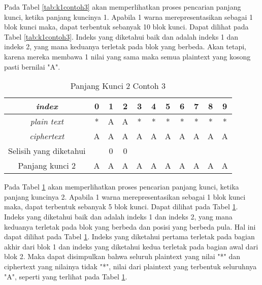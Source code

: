 	Pada Tabel \ref{tab:k1contoh3} akan memperlihatkan proses pencarian panjang kunci, ketika panjang kuncinya 1. Apabila 1 warna merepresentasikan sebagai 1 blok kunci maka, dapat terbentuk sebanyak 10 blok kunci. Dapat dilihat pada Tabel \ref{tab:k1contoh3}. Indeks yang diketahui baik \plaintext dan \ciphertext adalah indeks 1 dan indeks 2, yang mana keduanya terletak pada blok yang berbeda. Akan tetapi, karena mereka membawa 1 nilai yang sama maka semua plaintext yang kosong pasti bernilai "A".
	\\
	\begin{table}[H]
	 	\centering
	 	\caption{Panjang Kunci 2 Contoh 3}
	 	\setlength{\arrayrulewidth}{.08em}
	 	\begin{tabular}{|c|c|c|c|c|c|c|c|c|c|c|}\hline
	 	\textit{index}&0&1&2&3&4&5&6&7&8&9\\ \hline
	 	\textit{plain text}&\cellcolor{blue!15}*&\cellcolor{blue!15}A&\cellcolor{green!15}A&\cellcolor{green!15}*&\cellcolor{pink!30}*&\cellcolor{pink!30}*&\cellcolor{violet!30}*&\cellcolor{violet!30}*&\cellcolor{purple!25}*&\cellcolor{purple!25}*\\ \hline
	 	\textit{ciphertext}&\cellcolor{blue!15}A&\cellcolor{blue!15}A&\cellcolor{green!15}A&\cellcolor{green!15}A&\cellcolor{pink!30}A&\cellcolor{pink!30}A&\cellcolor{violet!30}A&\cellcolor{violet!30}A&\cellcolor{purple!25}A&\cellcolor{purple!25}A\\ \hline
		Selisih yang diketahui & &0&0& & & & & & & \\ \hline	
		Panjang kunci 2 &A&A&A&A&A&A&A&A&A&A\\ \hline 	
	 	\end{tabular}
	 	\label{tab:k2contoh3}
	\end{table}
	Pada Tabel \ref{tab:k2contoh3} akan memperlihatkan proses pencarian panjang kunci, ketika panjang kuncinya 2. Apabila 1 warna merepresentasikan sebagai 1 blok kunci maka, dapat terbentuk sebanyak 5 blok kunci. Dapat dilihat pada Tabel \ref{tab:k2contoh3}. Indeks yang diketahui baik \plaintext dan \ciphertext adalah indeks 1 dan indeks 2, yang mana keduanya terletak pada blok yang berbeda dan posisi yang berbeda pula. Hal ini dapat dilihat pada Tabel \ref{tab:k2contoh3}. Indeks yang diketahui pertama terletak pada bagian akhir dari blok 1 dan indeks yang diketahui kedua terletak pada bagian awal dari blok 2. Maka dapat disimpulkan bahwa seluruh plaintext yang nilai "*" dan ciphertext yang nilainya tidak "*", nilai dari plaintext yang terbentuk seluruhnya "A", seperti yang terlihat pada Tabel \ref{tab:k2contoh3}.
